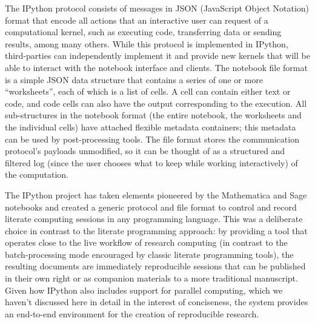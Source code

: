 \documentclass[ChapterTOCs,krantz2]{krantz} %
\theoremstyle{definition}
\begin{document}
The IPython protocol consists of messages in JSON (JavaScript Object Notation)
format that encode all actions that an interactive user can request of a
computational kernel, such as executing code, transferring data or sending
results, among many others.  While this protocol is implemented in IPython,
third-parties can independently implement it and provide new kernels that will
be able to interact with the notebook interface and clients.  The notebook file
format is a simple JSON data structure that contains a series of one or more
``worksheets'', each of which is a list of cells.  A cell can contain either
text or code, and code cells can also have the output corresponding to the
execution.  All sub-structures in the notebook format (the entire notebook, the
worksheets and the individual cells) have attached flexible metadata
containers; this metadata can be used by post-processing tools.  The file
format stores the communication protocol's payloads unmodified, so it can be
thought of as a structured and filtered log (since the user chooses what to
keep while working interactively) of the computation.  

The IPython project has taken elements pioneered by the Mathematica and Sage
notebooks and created a generic protocol and file format to control and record
literate computing sessions in any programming language.  This was a deliberate
choice in contrast to the literate programming approach: by providing a tool
that operates close to the live workflow of research computing (in contrast to
the batch-processing mode encouraged by classic literate programming tools),
the resulting documents are immediately reproducible sessions that can be
published in their own right or as companion materials to a more traditional
manuscript.  Given how IPython also includes support for parallel computing,
which we haven't discussed here in detail in the interest of conciseness, the
system provides an end-to-end environment for the creation of reproducible
research.
\end{document}

